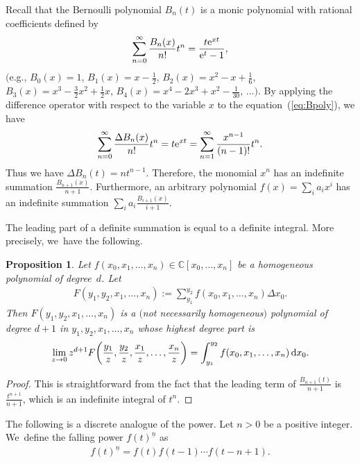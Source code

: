 \documentclass[10pt,a4paper]{amsart}
\numberwithin{equation}{section}
\newtheorem{Proposition}[Theorem]{Proposition}
{ \theoremstyle{definition}
\newtheorem{Definition}[Theorem]{Definition}
\newtheorem{Example}[Theorem]{Example}
\newtheorem{Remark}[Theorem]{Remark} }
\newcommand{\C}{\mathbb{C}}
\newcommand{\sint}{\sum\nolimits}
\begin{document}
\begin{Example}
Recall that the Bernoulli polynomial $B_n(t)$ is a monic polynomial
with rational coefficients defined by
\begin{gather}
\label{eq:Bpoly}
\sum_{n=0}^\infty
\frac{B_n(x)}{n !}t^n
=\frac{t{\rm e}^{xt}}{{\rm e}^t-1},
\end{gather}
$\big($e.g., $B_0(x)=1$, $B_1(x)=x-\frac{1}{2}$, $B_2(x)=x^2-x+\frac{1}{6}$,
$B_3(x)=x^3-\frac{3}{2}x^2+\frac{1}{2}x$,
$B_4(x)=x^4-2x^3+x^2-\frac{1}{30}$, $\ldots\big)$.
By applying the difference operator with respect to the variable $x$ to
the equation~(\ref{eq:Bpoly}), we have
\begin{gather*}
\sum_{n=0}^\infty
\frac{\Delta B_n(x)}{n !}t^n
=t{\rm e}^{xt}=\sum_{n=1}^\infty\frac{x^{n-1}}{(n-1)!}t^n.
\end{gather*}
Thus we have $\Delta B_n(t)=nt^{n-1}$.
Therefore, the monomial $x^n$ has an indefinite summation $\frac{B_{n+1}(x)}{n+1}$.
Furthermore, an arbitrary polynomial $f(x)=\sum_i a_ix^i$ has an indefinite summation
$\sum_ia_i\frac{B_{i+1}(x)}{i+1}$.
\end{Example}
The leading part of a definite summation is equal to a definite integral.
More precisely, we~have the following.

\begin{Proposition}\label{prop:leading}
Let $f(x_0, x_1, \dots, x_n)\in\C[x_0, \dots, x_n]$ be a homogeneous
polynomial of deg\-ree~$d$. Let
\begin{gather*}
F(y_1, y_2, x_1, \dots, x_n):=
\sint_{y_1}^{y_2}f(x_0, x_1, \dots, x_n)\Delta x_0.
\end{gather*}
Then $F(y_1, y_2, x_1, \dots, x_n)$ is a $($not necessarily homogeneous$)$
polynomial of degree $d+1$ in $y_1, y_2, x_1, \dots, x_n$
whose highest degree part is
\begin{gather*}
\lim_{z\to 0} z^{d+1}F\bigg(\frac{y_1}{z},\frac{y_2}{z},\frac{x_1}{z}, \dots,\frac{x_n}{z}\bigg)
=\int_{y_1}^{y_2}f(x_0, x_1, \dots, x_n)\, {\rm d} x_0.
\end{gather*}
\end{Proposition}

\begin{proof}
This is straightforward from the fact that the leading term of
$\frac{B_{n+1}(t)}{n+1}$ is $\frac{t^{n+1}}{n+1}$,
which is an indefinite integral of $t^n$.
\end{proof}

The following is a discrete analogue of the power.
Let $n>0$ be a positive integer. We~define the falling power
$f(t)^{\underline{n}}$ as
\begin{gather*}
f(t)^{\underline{n}}=f(t)f(t-1)\cdots f(t-n+1).
\end{gather*}
\end{document}
